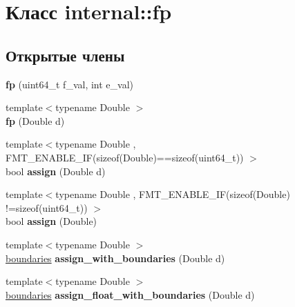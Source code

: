 \hypertarget{classinternal_1_1fp}{}\section{Класс internal\+:\+:fp}
\label{classinternal_1_1fp}
\subsection*{Открытые члены}
\begin{DoxyCompactItemize}
\item 
\mbox{\label{classinternal_1_1fp_a6697db0ca32b6662e0a87334e3400ac1}} 
{\bfseries fp} (uint64\+\_\+t f\+\_\+val, int e\+\_\+val)
\item 
\mbox{\label{classinternal_1_1fp_a8829f486ec892cdd08e1f856facb5f9b}} 
{\footnotesize template$<$typename Double $>$ }\\{\bfseries fp} (Double d)
\item 
\mbox{\label{classinternal_1_1fp_ab5e9137f1e2bc883afd2acd247c31cc0}} 
{\footnotesize template$<$typename Double , F\+M\+T\+\_\+\+E\+N\+A\+B\+L\+E\+\_\+\+I\+F(sizeof(\+Double)==sizeof(uint64\+\_\+t)) $>$ }\\bool {\bfseries assign} (Double d)
\item 
\mbox{\label{classinternal_1_1fp_aca64f41e030c9806c47a8e9c1b5dc2ac}} 
{\footnotesize template$<$typename Double , F\+M\+T\+\_\+\+E\+N\+A\+B\+L\+E\+\_\+\+I\+F(sizeof(\+Double) !=sizeof(uint64\+\_\+t)) $>$ }\\bool {\bfseries assign} (Double)
\item 
\mbox{\label{classinternal_1_1fp_a0547a3b836871f9b50469d37e1fddf6f}} 
{\footnotesize template$<$typename Double $>$ }\\\hyperlink{structinternal_1_1boundaries}{boundaries} {\bfseries assign\+\_\+with\+\_\+boundaries} (Double d)
\item 
\mbox{\label{classinternal_1_1fp_a6985974d83675666a09f106ae7ec6f05}} 
{\footnotesize template$<$typename Double $>$ }\\\hyperlink{structinternal_1_1boundaries}{boundaries} {\bfseries assign\+\_\+float\+\_\+with\+\_\+boundaries} (Double d)
\end{DoxyCompactItemize}
